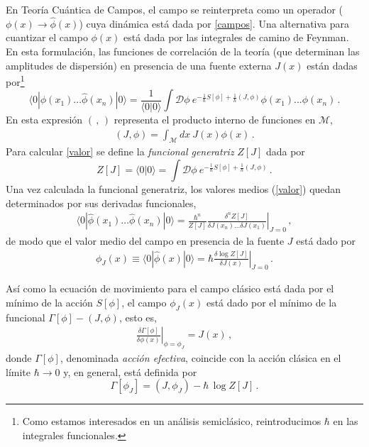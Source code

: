 En Teoría Cuántica de Campos, el campo se reinterpreta como un operador ($\phi(x) \rightarrow \hat{\phi}(x)$) cuya dinámica está dada por \eqref{campos}. Una alternativa para cuantizar el campo $\phi(x)$ está dada por las integrales de camino de Feynman. En esta formulación, las funciones de correlación de la teoría (que determinan las amplitudes de dispersión) en presencia de una fuente externa $J(x)$ están dadas por\footnote{ Como estamos interesados en un análisis semiclásico, reintroducimos $\hbar$ en las integrales funcionales.}
\begin{equation}
\langle 0 | \hat{ \phi  } (x _1) \ldots \hat{\phi  } (x _n) | 0 \rangle = \frac{1}{\langle 0|0\rangle} 
\int  \mathscr D
\phi \ e ^{- \frac{1}{\hbar} S[ \phi ] + \frac{1}{\hbar} (J, \phi )} \phi (x _1) ... \phi (x _n)\,.
\label{valor}
\end{equation}
En esta expresión $(\,,\,) $ representa el producto interno de funciones en $\mathcal{M}$,
\begin{align}
	(J,\phi) = \int_\mathcal{M} dx\ J(x) \phi (x)\,.
\end{align}
Para calcular \eqref{valor} se define la {\it funcional generatriz} $Z[J]$ dada por
\begin{equation}
Z [J] = \langle0|0\rangle=
\int \mathscr D \phi \ e ^{- \frac{1}{ \hbar} S[ \phi ] + \frac{1}{\hbar} (J, \phi )}\,.
\label{eq.generatriz}
\end{equation}
Una vez calculada la funcional generatriz, los valores medios (\ref{valor}) quedan determinados por sus derivadas funcionales,
\begin{equation}
\begin{array}{c}
\langle 0 | \hat{ \phi  } (x _1) \ldots \hat{\phi  } (x _n) | 0 \rangle = \frac{\hbar ^n}{Z[J]}
\left. \frac{\delta ^n  Z[J] }{ \delta J(x_n) \ldots \delta J(x _1) } 		\right| _{J=0}\,,
\end{array}
\end{equation}
de modo que el valor medio del campo en presencia de la fuente $J$ está dado por
\begin{equation}
\begin{array}{c}
\phi _J (x) \equiv \langle 0| \hat{\phi } (x)| 0 \rangle = \hbar \left. \frac{\delta \log Z[J] }{\delta J(x)} \right| _{J=0} \,.
\end{array}
\end{equation}

Así como la ecuación de movimiento para el campo clásico está dada por el mínimo de la acción $S[\phi]$, el campo $ \phi _J (x) $ está dado por el mínimo de la funcional $\Gamma[\phi]-(J,\phi)$, esto es,
\begin{equation}
\begin{array}{c}
\left.\frac{\delta \Gamma [ \phi ]  }{\delta \phi (x)  }\right|_{\phi=\phi_J} = 
J (x)\,,
\end{array}
\label{eq.accion1}
\end{equation}
donde $\Gamma[\phi]$, denominada {\it acción efectiva}, coincide con la acción clásica en el límite $\hbar\to 0$ y, en general, está definida por
\begin{equation}
\Gamma [\phi _J] = (J, \phi _J) -  \hbar \, \log Z [J]\,.
\label{efectiva}
\end{equation}

